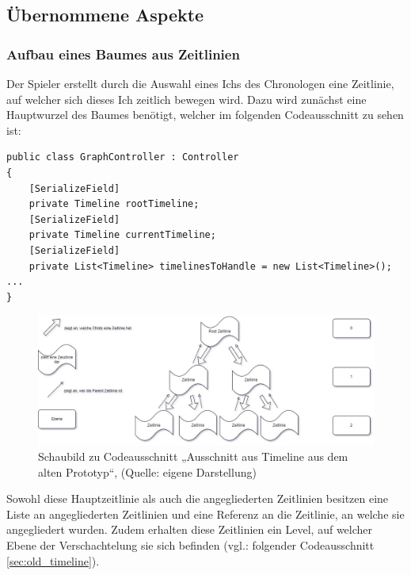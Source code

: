 \subsection{Übernommene Aspekte}
\subsubsection{Aufbau eines Baumes aus Zeitlinien}\label{sec:good_01}
Der Spieler erstellt durch die Auswahl eines Ichs des Chronologen eine Zeitlinie, auf welcher sich dieses Ich zeitlich bewegen wird. Dazu wird zunächst eine Hauptwurzel des Baumes benötigt, welcher im folgenden Codeausschnitt zu sehen ist:
\begin{lstlisting}[caption={Ausschnitt aus GraphController aus dem alten Prototypen}, label={sec:old_graphController}]
public class GraphController : Controller
{
    [SerializeField]
    private Timeline rootTimeline;
    [SerializeField]
    private Timeline currentTimeline;
    [SerializeField]
    private List<Timeline> timelinesToHandle = new List<Timeline>();
...
}
\end{lstlisting}
\label{sec:rootTimeline_pld}

\begin{figure}[ht]
\centering
\includegraphics[width=1\linewidth]{content/pictures/Schaubild Timeline.jpg}
\caption{Schaubild zu Codeausschnitt „Ausschnitt aus Timeline aus dem alten Prototyp“, (Quelle: eigene Darstellung)}
\label{fig:codesnippet_timeline}
\end{figure}

Sowohl diese Hauptzeitlinie als auch die angegliederten Zeitlinien besitzen eine Liste an angegliederten Zeitlinien und eine Referenz an die Zeitlinie, an welche sie angegliedert wurden. Zudem erhalten diese Zeitlinien ein Level, auf welcher Ebene der Verschachtelung sie sich befinden (vgl.: folgender Codeausschnitt \ref{sec:old_timeline}).


